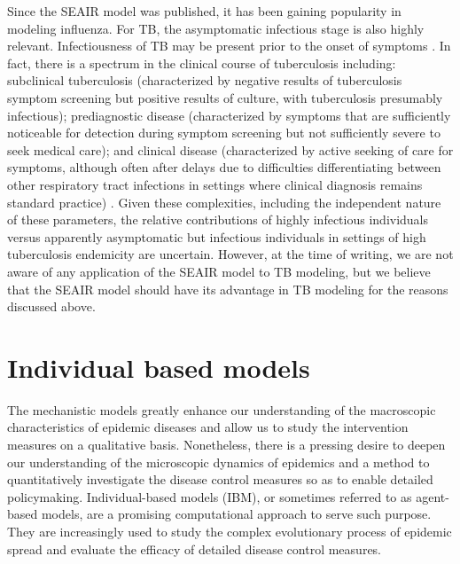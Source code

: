 \documentclass[8pt,twocolumn]{extarticle}
\begin{document}
Since the SEAIR model was published, it has been gaining popularity in modeling influenza. For TB, the asymptomatic infectious stage is also highly relevant. Infectiousness of TB may be present prior to the onset of symptoms \cite{Aimportance1}\cite{Aimportance2}\cite{Aimportance3}. In fact, there is a spectrum in the clinical course of tuberculosis \cite{Aimportance4} including: subclinical tuberculosis (characterized by negative results of tuberculosis symptom screening but positive results of culture, with tuberculosis presumably infectious); prediagnostic disease (characterized by symptoms that are sufficiently noticeable for detection during symptom screening but not sufficiently severe to seek medical care); and clinical disease (characterized by active seeking of care for symptoms, although often after delays due to difficulties differentiating between other respiratory tract infections in settings where clinical diagnosis remains standard practice) \cite{Aimportance5}. Given these complexities, including the independent nature of these parameters, the relative contributions of highly infectious individuals versus apparently asymptomatic but infectious individuals in settings of high tuberculosis endemicity are uncertain. However, at the time of writing, we are not aware of any application of the SEAIR model to TB modeling, but we believe that the SEAIR model should have its advantage in TB modeling for the reasons discussed above.

\section{Individual based models}

The mechanistic models greatly enhance our understanding of the macroscopic characteristics of epidemic diseases and allow us to study the intervention measures on a qualitative basis. Nonetheless, there is a pressing desire to deepen our understanding of the microscopic dynamics of epidemics and a method to quantitatively investigate the disease control measures so as to enable detailed policymaking. Individual-based models (IBM), or sometimes referred to as agent-based models, are a promising computational approach to serve such purpose. They are increasingly used to study the complex evolutionary process of epidemic spread and evaluate the efficacy of detailed disease control measures.
\end{document}
